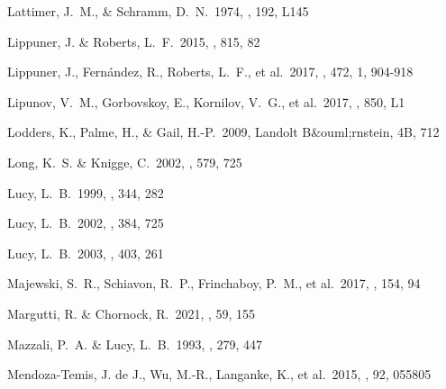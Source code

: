 \documentclass[twocolumn, twocolappendix]{aastex63}
\begin{document}
\begin{thebibliography}{}
 Lattimer, J.~M., \& Schramm, D.~N.\ 1974, \apjl, 192, L145




 Lippuner, J. \& Roberts, L.~F.\ 2015, \apj, 815, 82


 Lippuner, J., Fern\'{a}ndez, R., Roberts, L.~F., et al.\ 2017, \mnras, 472, 1, 904-918


 Lipunov, V.~M., Gorbovskoy, E., Kornilov, V.~G., et al.\ 2017, \apjl, 850, L1


 Lodders, K., Palme, H., \& Gail, H.-P.\ 2009, Landolt B\&ouml;rnstein, 4B, 712

 Long, K.~S. \& Knigge, C.\ 2002, \apj, 579, 725




 Lucy, L.~B.\ 1999, \aap, 344, 282




 Lucy, L.~B.\ 2002, \aap, 384, 725


 Lucy, L.~B.\ 2003, \aap, 403, 261




 Majewski, S.~R., Schiavon, R.~P., Frinchaboy, P.~M., et al.\ 2017, \aj, 154, 94

 Margutti, R. \& Chornock, R.\ 2021, \araa, 59, 155

 Mazzali, P.~A. \& Lucy, L.~B.\ 1993, \aap, 279, 447


 Mendoza-Temis, J. de J., Wu, M.-R., Langanke, K., et al.\ 2015, \prc, 92, 055805



\end{thebibliography}
\end{document}

